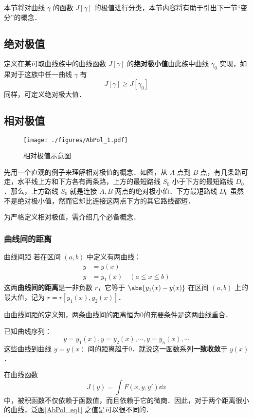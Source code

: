 

本节将对曲线 $\gamma$ 的函数 $J[\gamma]$ 的极值进行分类，本节内容将有助于引出下一节“变分”的概念．

\subsection{绝对极值}
定义在某可取曲线族中的曲线函数 $J[\gamma]$ 的\textbf{绝对极小值}由此族中曲线 $\gamma_0$ 实现，如果对于这族中任一曲线 $\gamma$ 有
\begin{equation}
J[\gamma]\geq J[\gamma_0]
\end{equation}
同样，可定义绝对极大值．
\subsection{相对极值}
\begin{figure}[ht]
\centering
\texttt{[image: ./figures/AbPol\_1.pdf]}
\caption{相对极值示意图} \label{AbPol_fig1}
\end{figure}

先用一个直观的例子来理解相对极值的概念．如图，从 $A$ 点到 $B$ 点，有几条路可走，水平线上方和下方各有两条路，上方的最短路线 $S_0$ 小于下方的最短路线 $D_0$ ．那么，上方路线 $S_0$ 就是连接 $A,B$ 两点的绝对极小值．下方最短路线 $D_0$ 虽然不是绝对极小值，然而它却比连接这两点下方的其它路线都短． 

为严格定义相对极值，需介绍几个必备概念．
\subsubsection{曲线间的距离}
\begin{definition}{曲线间距}
若在区间 $(a,b)$ 中定义有两曲线：
\begin{equation}
\begin{aligned}
y&=y(x)\\
y&=y_1(x)\quad(a\leq x\leq b)
\end{aligned}
\end{equation}
这两\textbf{曲线间的距离}是一非负数 $r$，它等于 $\abs{y_1(x)-y(x)}$ 在区间 $(a,b)$ 上的最大值，记为 $r=r[y_1(x),y_2(x)]$．
\end{definition}
由曲线间距的定义知，两条曲线间的距离恒为0的充要条件是这两曲线重合．

已知曲线序列：
\begin{equation}
y=y_1(x),y=y_2(x),\cdots,y=y_n(x),\cdots
\end{equation}
这些曲线到曲线 $y=y(x)$ 间的距离趋于0．就说这一函数系列\textbf{一致收敛}于 $y(x)$．

在曲线函数
\begin{equation}\label{AbPol_eq1}
J(y)=\int F(x,y,y')\dd x
\end{equation}
中，被积函数不仅依赖于函数值，而且依赖于它的微商．因此，对于两个距离很小的曲线，泛函\autoref{AbPol_eq1} 之值是可以很不同的．
